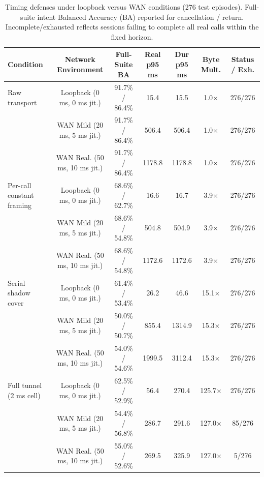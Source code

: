 \begin{table}[t]
\centering
\caption{Timing defenses under loopback versus WAN conditions (276 test episodes). Full-suite intent Balanced Accuracy (BA) reported for cancellation / return. Incomplete/exhausted reflects sessions failing to complete all real calls within the fixed horizon.}
\label{tab:wan-controls-comparison}
\small
\begin{tabular}{lcccccc}
\toprule
\textbf{Condition} & \textbf{Network Environment} & \textbf{Full-Suite BA} & \textbf{Real p95 ms} & \textbf{Dur p95 ms} & \textbf{Byte Mult.} & \textbf{Status / Exh.} \\
\midrule
Raw transport & Loopback (0 ms, 0 ms jit.) & 91.7\% / 86.4\% & 15.4 & 15.5 & 1.0$\times$ & 276/276 \\
& WAN Mild (20 ms, 5 ms jit.) & 91.7\% / 86.4\% & 506.4 & 506.4 & 1.0$\times$ & 276/276 \\
& WAN Real. (50 ms, 10 ms jit.) & 91.7\% / 86.4\% & 1178.8 & 1178.8 & 1.0$\times$ & 276/276 \\
\midrule
Per-call constant framing & Loopback (0 ms, 0 ms jit.) & 68.6\% / 62.7\% & 16.6 & 16.7 & 3.9$\times$ & 276/276 \\
& WAN Mild (20 ms, 5 ms jit.) & 68.6\% / 54.8\% & 504.8 & 504.9 & 3.9$\times$ & 276/276 \\
& WAN Real. (50 ms, 10 ms jit.) & 68.6\% / 54.8\% & 1172.6 & 1172.6 & 3.9$\times$ & 276/276 \\
\midrule
Serial shadow cover & Loopback (0 ms, 0 ms jit.) & 61.4\% / 53.4\% & 26.2 & 46.6 & 15.1$\times$ & 276/276 \\
& WAN Mild (20 ms, 5 ms jit.) & 50.0\% / 50.7\% & 855.4 & 1314.9 & 15.3$\times$ & 276/276 \\
& WAN Real. (50 ms, 10 ms jit.) & 54.0\% / 54.6\% & 1999.5 & 3112.4 & 15.3$\times$ & 276/276 \\
\midrule
Full tunnel (2 ms cell) & Loopback (0 ms, 0 ms jit.) & 62.5\% / 52.9\% & 56.4 & 270.4 & 125.7$\times$ & 276/276 \\
& WAN Mild (20 ms, 5 ms jit.) & 54.4\% / 56.8\% & 286.7 & 291.6 & 127.0$\times$ & 85/276 \\
& WAN Real. (50 ms, 10 ms jit.) & 55.0\% / 52.6\% & 269.5 & 325.9 & 127.0$\times$ & 5/276 \\
\bottomrule
\end{tabular}
\end{table}